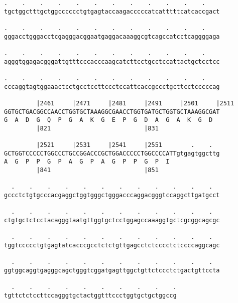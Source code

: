 \documentclass{article}
\begin{document}
\begin{Verbatim}
.    .    .    .    .    .    .    .    .    .    .    .    
tgctggctttgctggcccccctgtgagtaccaagacccccatcatttttcatcaccgact
                                                            
.    .    .    .    .    .    .    .    .    .    .    .    
gggacctgggacctcgagggacggaatgaggacaaaggcgtcagccatcctcaggggaga
                                                            
.    .    .    .    .    .    .    .    .    .    .    .    
agggtggagacgggattgtttcccacccaagcatcttcctgcctccattactgctcctcc
                                                            
.    .    .    .    .    .    .    .    .    .    .    .    
cccaggtagtggaaactcctgcctccttccctccattcaccgccctgcttcctcccccag
                                                            
         |2461     |2471     |2481     |2491     |2501     |2511
GGTGCTGACGGCCAACCTGGTGCTAAAGGCGAACCTGGTGATGCTGGTGCTAAAGGCGAT
G  A  D  G  Q  P  G  A  K  G  E  P  G  D  A  G  A  K  G  D  
         |821                          |831                 
  
         |2521     |2531     |2541     |2551        .    .  
GCTGGTCCCCCTGGCCCTGCCGGACCCGCTGGACCCCCTGGCCCCATTgtgagtggcttg
A  G  P  P  G  P  A  G  P  A  G  P  P  G  P  I              
         |841                          |851                 
  
  .    .    .    .    .    .    .    .    .    .    .    .  
gccctctgtgcccacgaggctggtgggctgggacccaggacgggtccaggcttgatgcct
                                                            
  .    .    .    .    .    .    .    .    .    .    .    .  
ctgtgctctcctacagggtaatgttggtgctcctggagccaaaggtgctcgcggcagcgc
                                                            
  .    .    .    .    .    .    .    .    .    .    .    .  
tggtccccctgtgagtatcacccgcctctctgttgagcctctcccctctccccaggcagc
                                                            
  .    .    .    .    .    .    .    .    .    .    .    .  
ggtggcaggtgagggcagctgggtcggatgagttggctgttctccctctgactgttccta
                                                            
  .    .    .    .    .    .    .    .    .    .
tgttctctccttccagggtgctactggtttccctggtgctgctggccg
                                                
                                                
 

\end{Verbatim}
\end{document}
